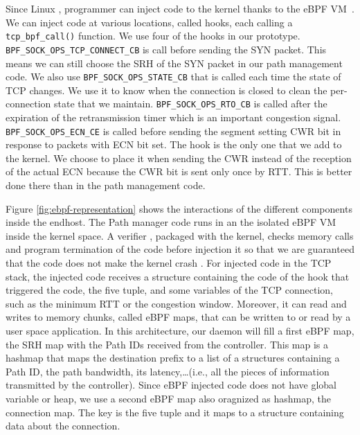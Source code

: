 Since Linux , programmer can inject code to the kernel thanks to the eBPF VM~\cite{ebpf}.
We can inject code at various locations, called hooks, each calling a \texttt{tcp\_bpf\_call()} function.
We use four of the hooks in our prototype. \texttt{BPF\_SOCK\_OPS\_TCP\_CONNECT\_CB}
is call before sending the SYN packet. This means we can still choose the SRH of the SYN packet in
our path management code. We also use \texttt{BPF\_SOCK\_OPS\_STATE\_CB} that is called each time the state
of TCP changes. We use it to know when the connection is closed to clean the per-connection state that we maintain.
\texttt{BPF\_SOCK\_OPS\_RTO\_CB} is called after the expiration of the retransmission timer
which is an important congestion signal.
\texttt{BPF\_SOCK\_OPS\_ECN\_CE} is called before sending the segment setting CWR bit
in response to packets with ECN bit set. The hook is the only one that we add to the kernel.
We choose to place it when sending the CWR instead of the reception of the actual ECN because
the CWR bit is sent only once by RTT. This is better done there than in the path management code.

Figure \ref{fig:ebpf-representation} shows the interactions
of the different components inside the endhost.
The Path manager code runs in an the isolated eBPF VM inside the kernel space.
A verifier \cite{ebpf-verifier}, packaged with the kernel, checks memory calls and program termination of the code
before injection it so that we are guaranteed that the code does not make the kernel crash .
For injected code in the TCP stack, the injected code receives a structure
containing the code of the hook that triggered the code, the five tuple,
and some variables of the TCP connection, such as the minimum RTT or the congestion window.
Moreover, it can read and writes to memory chunks, called eBPF maps, that can be written to or read
by a user space application. In this architecture, our daemon will fill a first eBPF map, the SRH map
with the Path IDs received from the controller.
This map is a hashmap that maps the destination prefix to a list of a structures containing a Path ID,
the path bandwidth, its latency,\dots (i.e., all the pieces of information transmitted by the controller).
Since eBPF injected code does not have global variable or heap, we use a second eBPF map also oragnized as hashmap,
the connection map.
The key is the five tuple and it maps to a structure containing data about the connection.

